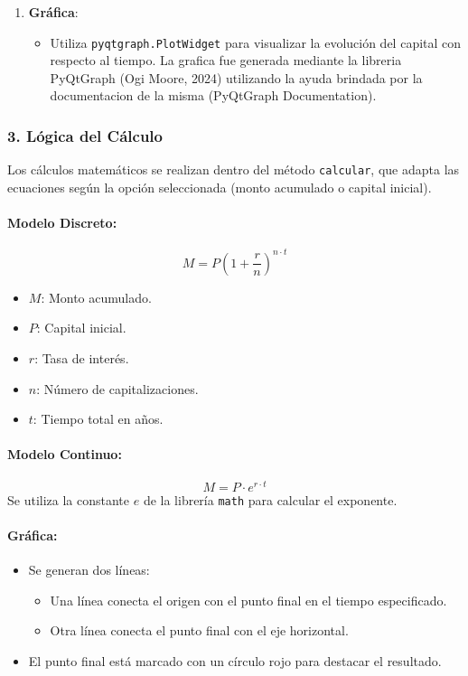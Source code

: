 \documentclass{article}
\begin{document}
\begin{enumerate}
    \item \textbf{Gráfica}:
    \begin{itemize}
        \item Utiliza \texttt{pyqtgraph.PlotWidget} para visualizar la evolución del capital con respecto al tiempo. La grafica fue generada mediante la libreria PyQtGraph (Ogi Moore, 2024) utilizando la ayuda brindada por la documentacion de la misma (PyQtGraph Documentation).
    \end{itemize}
\end{enumerate}

\subsubsection{3. Lógica del Cálculo}
Los cálculos matemáticos se realizan dentro del método \texttt{calcular}, que adapta las ecuaciones según la opción seleccionada (monto acumulado o capital inicial).

\paragraph{Modelo Discreto:}
\begin{equation}
M = P \left(1 + \frac{r}{n}\right)^{n \cdot t}
\end{equation}
\begin{itemize}
    \item \(M\): Monto acumulado.
    \item \(P\): Capital inicial.
    \item \(r\): Tasa de interés.
    \item \(n\): Número de capitalizaciones.
    \item \(t\): Tiempo total en años.
\end{itemize}

\paragraph{Modelo Continuo:}
\begin{equation}
M = P \cdot e^{r \cdot t}
\end{equation}
Se utiliza la constante \(e\) de la librería \texttt{math} para calcular el exponente.

\paragraph{Gráfica:}
\begin{itemize}
    \item Se generan dos líneas:
        \begin{itemize}
            \item Una línea conecta el origen con el punto final en el tiempo especificado.
            \item Otra línea conecta el punto final con el eje horizontal.
        \end{itemize}
    \item El punto final está marcado con un círculo rojo para destacar el resultado.
\end{itemize}
\end{document}
